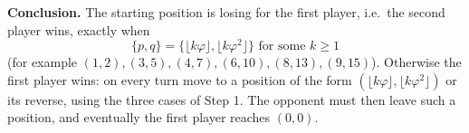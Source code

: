 \textbf{Conclusion.} The starting position is losing for the first player, i.e.\ the second player wins, exactly when
\[
\boxed{\{p,q\}=\{\lfloor k\varphi\rfloor,\lfloor k\varphi^2\rfloor\}\text{ for some } k\ge1}
\]
(for example $(1,2),(3,5),(4,7),(6,10),(8,13),(9,15)$). Otherwise the first player wins: on every turn move to a position of the form $(\lfloor k\varphi\rfloor,\lfloor k\varphi^2\rfloor)$ or its reverse, using the three cases of Step 1. The opponent must then leave such a position, and eventually the first player reaches $(0,0)$.
